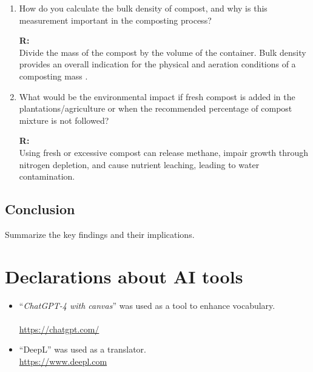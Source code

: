 \documentclass{article}
\newcounter{myequation}
\begin{document}
\begin{enumerate}
    \item How do you calculate the bulk density of compost, and why is this measurement
        important in the composting process?

        \textbf{R:\\}
        Divide the mass of the compost by the volume of the container. Bulk density
        provides an overall indication for the physical and aeration conditions of a
        composting mass \parencite{bulk_density}.

    \item What would be the environmental impact if fresh compost is added in the
        plantations/agriculture or when the recommended percentage of compost mixture
        is not followed?

        \textbf{R:\\}
            Using fresh or excessive compost can release methane, impair growth through
            nitrogen depletion, and cause nutrient leaching, leading to water contamination.

\end{enumerate}

\subsection{Conclusion}
Summarize the key findings and their implications.

\newpage
\setlength{\bibitemsep}{1.2\baselineskip}

\printbibliography

\listoftables

\listoffigures

\listofmyequations

\section*{Declarations about AI tools}
\begin{itemize}
    \item ``\textit{ChatGPT-4 with canvas}'' was used as a tool to enhance vocabulary.\\
        {}\\
        \url{https://chatgpt.com/}
    \item ``DeepL'' was used as a translator.\\
        \url{https://www.deepl.com}
\end{itemize}
\end{document}
